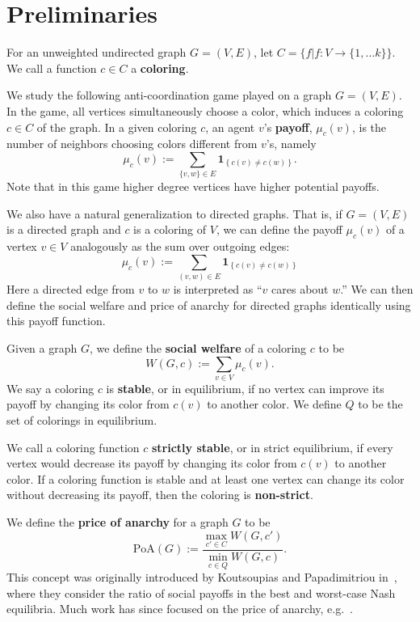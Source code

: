 \documentclass{llncs}
\newcommand{\ind}[1]{\textbf{1}_{\left \{ #1 \right \}}}
\begin{document}
\section{Preliminaries}

For an unweighted undirected graph $G=(V,E)$, let $C = \{f | f: V
\to \{1, \ldots k \}\}.$ We call a function $c \in C$ a \textbf{coloring}.

We study the following anti-coordination game played on a graph $G=(V,E)$.  In
the game, all vertices simultaneously choose a color, which induces a coloring
$c \in C$ of the graph.  In a given coloring $c$, an agent $v$'s
\textbf{payoff}, $\mu_c(v)$, is the number of neighbors choosing colors
different from $v$'s, namely 
\[ 
   \mu_c(v) := \sum_{\{v,w\} \in E} \ind{c(v) \neq c(w)}.  
\] 
Note that in this game higher degree vertices have higher potential payoffs.

We also have a natural generalization to directed graphs.  That is, if $G =
(V,E)$ is a directed graph and $c$ is a coloring of $V$, we can define the
payoff $\mu_c(v)$ of a vertex $v \in V$ analogously as the sum over outgoing
edges:
\[ 
	\mu_c(v) := \sum_{(v,w) \in E} \ind{c(v) \neq c(w)}
\]
Here a directed edge from $v$ to $w$ is interpreted as ``$v$ cares about $w$.''
We can then define the social welfare and price of anarchy for directed graphs
identically using this payoff function. 

Given a graph $G$, we define the \textbf{social welfare} of a coloring $c$ to
be
\[
   W(G,c) := \sum_{v \in V} \mu_c(v).
\]
We say a coloring $c$ is \textbf{stable}, or in {equilibrium}, if no vertex can
improve its payoff by changing its color from $c(v)$ to another color. We
define $Q$ to be the set of colorings in equilibrium.

We call a coloring function $c$ \textbf{strictly stable}, or in {strict
equilibrium}, if every vertex would decrease its payoff by changing its color
from $c(v)$ to another color. If a coloring function is stable and at least one
vertex can change its color without decreasing its payoff, then the coloring is
\textbf{non-strict}.


We define the \textbf{price of anarchy} for a graph $G$ to be
\[
\mbox{PoA}(G) := \frac{\max_{c' \in C}W(G,c')}
{\min_{c \in Q}W(G,c)}.
\]
This concept
was originally introduced by Koutsoupias and
Papadimitriou in~\cite{KP99}, where they consider the ratio of social payoffs in
the best and worst-case Nash equilibria. Much work has since focused on the price of anarchy, 
e.g.~\cite{FKKMS02,RT02}.\\
\end{document}
